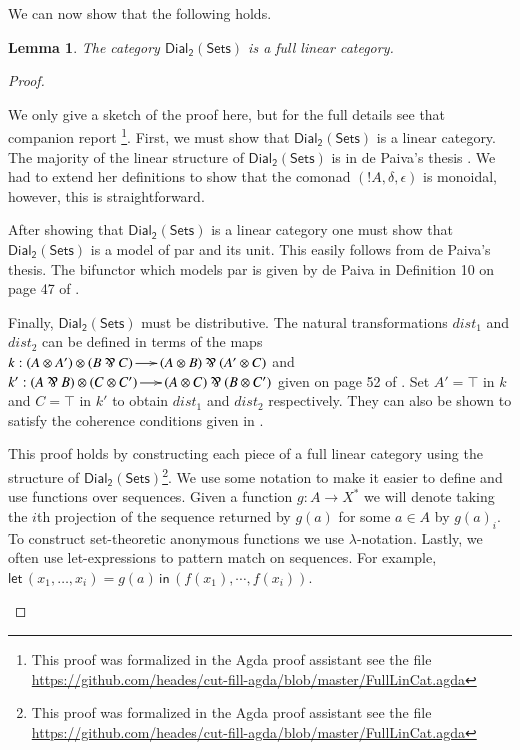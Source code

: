 \documentclass{elsarticle}
\newcommand{\dial}[0]{\mathsf{Dial_2}(\mathsf{Sets})}
\newcommand{\lett}[0]{\mathsf{let}\,}
\newcommand{\inn}[0]{\,\mathsf{in}\,}
\newtheorem{lemma}[theorem]{Lemma}
\begin{document}
We can now show that the following holds.
\begin{lemma}
  \label{lemma:ddial_is_a_linear_category}
  The category $\dial$ is a full linear category.
\end{lemma}
\begin{proof}
  \begin{paper}
    We only give a sketch of the proof here, but for the full details
    see that companion report \cite{Eades:2015}\footnote{This proof
      was formalized in the Agda proof assistant see the file
      \url{https://github.com/heades/cut-fill-agda/blob/master/FullLinCat.agda}}. First,
    we must show that $\dial$ is a linear category.  The majority of
    the linear structure of $\dial$ is in de Paiva's thesis
    \cite{dePaiva:1988}.  We had to extend her definitions to show
    that the comonad $(!A,\delta,\epsilon)$ is monoidal, however, this
    is straightforward.

    After showing that $\dial$ is a linear category one must show that
    $\dial$ is a model of par and its unit.  This easily follows from
    de Paiva's thesis.  The bifunctor which models par is given by de
    Paiva in Definition 10 on page 47 of \cite{dePaiva:1988}.

    Finally, $\dial$ must be distributive.  The natural
    transformations $dist_1$ and $dist_2$ can be defined in terms of
    the maps $k : (A \otimes A') \otimes (B \parr C) \to (A \otimes B)
    \parr (A' \otimes C)$ and $k' : (A \parr B) \otimes (C \otimes C')
    \to (A \otimes C) \parr (B \otimes C')$ given on page 52 of
    \cite{dePaiva:1988}.  Set $A' = \top$ in $k$ and $C = \top$ in
    $k'$ to obtain $dist_1$ and $dist_2$ respectively.  They can also
    be shown to satisfy the coherence conditions given in
    \cite{Cockett:1997}.
  \end{paper}
\begin{report}
  This proof holds by constructing each piece of a full linear
  category using the structure of $\dial$\footnote{This proof was
    formalized in the Agda proof assistant see the file
    \url{https://github.com/heades/cut-fill-agda/blob/master/FullLinCat.agda}}.
  We use some notation to make it easier to define and use functions
  over sequences.  Given a function $g : A \to X^*$ we will denote
  taking the $i$th projection of the sequence returned by $g(a)$ for
  some $a \in A$ by $g(a)_i$.  To construct set-theoretic anonymous
  functions we use $\lambda$-notation.  Lastly, we often use
  let-expressions to pattern match on sequences.  For example, $\lett
  (x_1,\ldots,x_i) = g(a) \inn (f(x_1),\cdots,f(x_i))$.
    

\end{report}
\end{proof}
\end{document}
